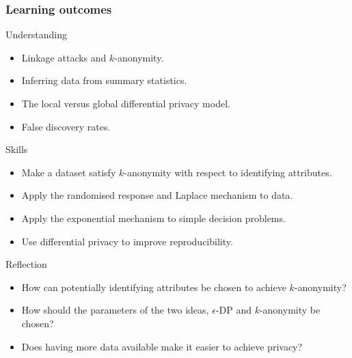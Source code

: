 \begin{frame}
  \frametitle{Learning outcomes}
  \begin{block}{Understanding}
    \begin{itemize}
    \item Linkage attacks and $k$-anonymity.
    \item Inferring data from summary statistics.
    \item The local versus global differential privacy model.
    \item False discovery rates.
    \end{itemize}
  \end{block}
  
  \begin{block}{Skills}
    \begin{itemize}
    \item Make a dataset satisfy $k$-anonymity with respect to identifying attributes.
    \item Apply the randomised response and Laplace mechanism to data.
    \item Apply the exponential mechanism to simple decision problems.
    \item Use differential privacy to improve reproducibility.
    \end{itemize}
  \end{block}

  \begin{block}{Reflection}
    \begin{itemize}
    \item How can potentially identifying attributes be chosen to achieve $k$-anonymity?
    \item How should the parameters of the two ideas, $\epsilon$-DP and $k$-anonymity be chosen?
    \item Does having more data available make it easier to achieve privacy?
    \end{itemize}
  \end{block}
  
\end{frame}

  

